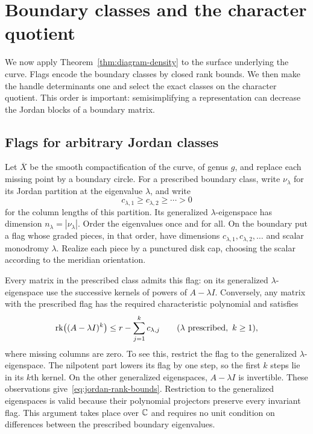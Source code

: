\section{Boundary classes and the character quotient}
\label{sec:descent}

We now apply Theorem~\ref{thm:diagram-density} to the surface underlying
the curve.  Flags encode the boundary classes by closed rank bounds.
We then make the handle determinants one and select the exact classes
on the character quotient.  This order is important: semisimplifying
a representation can decrease the Jordan blocks of a boundary
matrix.

\subsection{Flags for arbitrary Jordan classes}

Let $\overline X$ be the smooth compactification of the curve, of
genus $g$, and replace each missing point by a boundary circle.
For a prescribed boundary class, write $\nu_\lambda$ for its Jordan
partition at the eigenvalue $\lambda$, and write
\[
 c_{\lambda,1}\ge c_{\lambda,2}\ge\cdots>0
\]
for the column lengths of this partition.  Its generalized
$\lambda$-eigenspace has dimension $n_\lambda=|\nu_\lambda|$.
Order the eigenvalues once and for all.  On the boundary put a flag
whose graded pieces, in that order, have dimensions
$c_{\lambda,1},c_{\lambda,2},\ldots$ and scalar monodromy $\lambda$.
Realize each piece by a punctured disk cap, choosing the scalar
according to the meridian orientation.

Every matrix in the prescribed class admits this flag: on its
generalized $\lambda$-eigenspace use the successive kernels of powers
of $A-\lambda I$.  Conversely, any matrix with the prescribed flag
has the required characteristic polynomial and satisfies
\begin{equation}\label{eq:jordan-rank-bounds}
 \operatorname{rk}\bigl((A-\lambda I)^k\bigr)
 \le r-\sum_{j=1}^k c_{\lambda,j}
 \qquad(\lambda\text{ prescribed},\ k\ge1),
\end{equation}
where missing columns are zero.  To see this, restrict the flag to
the generalized $\lambda$-eigenspace.  The nilpotent part lowers its
flag by one step, so the first $k$ steps lie in its $k$th kernel.
On the other generalized eigenspaces, $A-\lambda I$ is invertible.
These observations give~\eqref{eq:jordan-rank-bounds}.
Restriction to the generalized eigenspaces is valid because their
polynomial projectors preserve every invariant flag.  This argument
takes place over $\mathbb C$ and requires no unit condition on differences
between the prescribed boundary eigenvalues.

